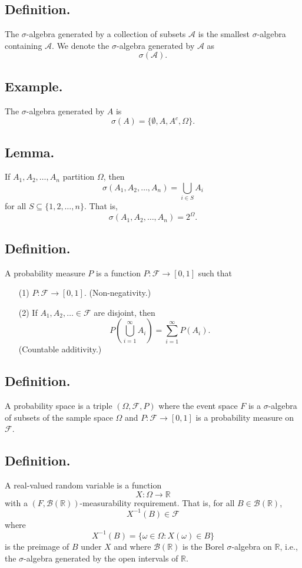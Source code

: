 \documentclass[titlepage]{article}
\begin{document}
\subsection{Definition.} The $\sigma$-algebra generated by a collection of subsets $\mathcal{A}$ is the smallest $\sigma$-algebra containing $\mathcal{A}$. We denote the $\sigma$-algebra generated by $\mathcal{A}$ as
$$\sigma(\mathcal{A}).$$

\subsection{Example.} The $\sigma$-algebra generated by $A$ is 
$$\sigma(A) = \{\emptyset, A, A^{c}, \Omega\}.$$

\subsection{Lemma.} If $A_{1}, A_{2}, \ldots, A_{n}$ partition $\Omega$, then 
$$\sigma(A_{1}, A_{2}, \ldots, A_{n}) = \bigcup_{i \in S}A_{i}$$
for all $S \subseteq \{1, 2, \ldots, n\}$. That is, 
$$\sigma(A_{1}, A_{2}, \ldots, A_{n}) = 2^{\Omega}.$$

\subsection{Definition.} A probability measure $P$ is a function $P: \mathcal{F} \to [0, 1]$ such that 
\begin{enumerate}
\item[(1)] $P: \mathcal{F} \to [0, 1]$. (Non-negativity.)
\item[(2)] If $A_{1}, A_{2}, \ldots \in \mathcal{F}$ are disjoint, then 
$$P\left(\bigcup_{i=1}^{\infty}A_{i}\right) = \sum_{i=1}^{\infty}P(A_{i}).$$
(Countable additivity.)
\end{enumerate}

\subsection{Definition.} A probability space is a triple $(\Omega, \mathcal{F}, P)$ where the event space $F$ is a $\sigma$-algebra of subsets of the sample space $\Omega$ and $P: \mathcal{F} \to [0, 1]$ is a probability measure on $\mathcal{F}$.

\subsection{Definition.} A real-valued random variable is a function 
$$X: \Omega \to \mathbb{R}$$
with a $(F, \mathcal{B}(\mathbb{R}))$-measurability requirement. That is, for all $B \in \mathcal{B}(\mathbb{R})$, 
$$X^{-1}(B) \in \mathcal{F}$$
where 
$$X^{-1}(B) = \{\omega \in \Omega: X(\omega) \in B\}$$
is the preimage of $B$ under $X$ and where $\mathcal{B}(\mathbb{R})$ is the Borel $\sigma$-algebra on $\mathbb{R}$, i.e., the $\sigma$-algebra generated by the open intervals of $\mathbb{R}$.
\end{document}
